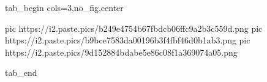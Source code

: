  
 
 
 
 


\ifcmt
  tab_begin cols=3,no_fig,center

     pic https://i2.paste.pics/b249e4754b67fbdcb06ffc9a2b3c559d.png
		 pic https://i2.paste.pics/b9bce7583da00196b3f4fbf46d0b1ab3.png
		 pic https://i2.paste.pics/9d152884bdabe5e86c08f1a369074a05.png

  tab_end
\fi
